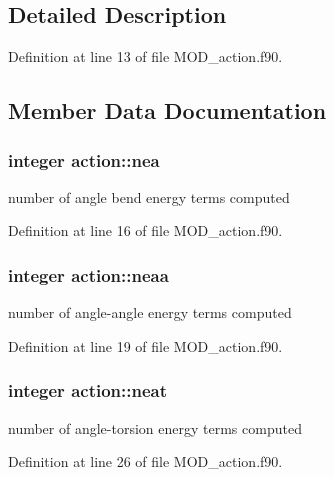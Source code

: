\subsection{Detailed Description}


Definition at line 13 of file M\-O\-D\-\_\-action.\-f90.



\subsection{Member Data Documentation}
\hypertarget{classaction_a55f3179dc359874a80270c8c5076dcaa}{
\subsubsection[{nea}]{\setlength{\rightskip}{0pt plus 5cm}integer action\-::nea}}\label{classaction_a55f3179dc359874a80270c8c5076dcaa}


number of angle bend energy terms computed 



Definition at line 16 of file M\-O\-D\-\_\-action.\-f90.

\hypertarget{classaction_a5d5f8160a0e42d793a8db7781e1bbdd8}{
\subsubsection[{neaa}]{\setlength{\rightskip}{0pt plus 5cm}integer action\-::neaa}}\label{classaction_a5d5f8160a0e42d793a8db7781e1bbdd8}


number of angle-\/angle energy terms computed 



Definition at line 19 of file M\-O\-D\-\_\-action.\-f90.

\hypertarget{classaction_abe35a8a2f1663f0e0be7ddf1567e41ad}{
\subsubsection[{neat}]{\setlength{\rightskip}{0pt plus 5cm}integer action\-::neat}}\label{classaction_abe35a8a2f1663f0e0be7ddf1567e41ad}


number of angle-\/torsion energy terms computed 



Definition at line 26 of file M\-O\-D\-\_\-action.\-f90.

